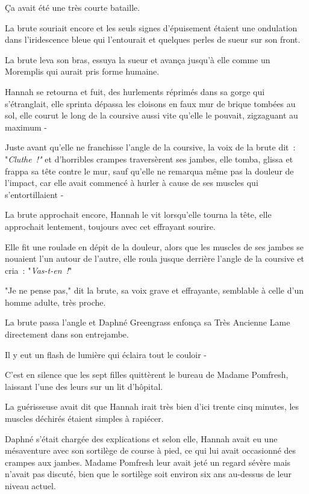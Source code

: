 Ça avait été une très courte bataille.

La brute souriait encore et les seuls signes d'épuisement étaient une ondulation dans l'iridescence bleue qui l'entourait et quelques perles de sueur sur son front.

La brute leva son bras, essuya la sueur et avança jusqu'à elle comme un Moremplis qui aurait pris forme humaine.

Hannah se retourna et fuit, des hurlements réprimés dans sa gorge qui s'étranglait, elle sprinta dépassa les cloisons en faux mur de brique tombées au sol, elle courut le long de la coursive aussi vite qu'elle le pouvait, zigzaguant au maximum -

Juste avant qu'elle ne franchisse l'angle de la coursive, la voix de la brute dit~: "\emph{Cluthe~!"} et d'horribles crampes traversèrent ses jambes, elle tomba, glissa et frappa sa tête contre le mur, sauf qu'elle ne remarqua même pas la douleur de l'impact, car elle avait commencé à hurler à cause de ses muscles qui s'entortillaient -

La brute approchait encore, Hannah le vit lorsqu'elle tourna la tête, elle approchait lentement, toujours avec cet effrayant sourire.

Elle fit une roulade en dépit de la douleur, alors que les muscles de ses jambes se nouaient l'un autour de l'autre, elle roula jusque derrière l'angle de la coursive et cria~: "\emph{Vas-t-en~!}"

"Je ne pense pas," dit la brute, sa voix grave et effrayante, semblable à celle d'un homme adulte, très proche.

La brute passa l'angle et Daphné Greengrass enfonça sa Très Ancienne Lame directement dans son entrejambe.

Il y eut un flash de lumière qui éclaira tout le couloir -

\later

C'est en silence que les sept filles quittèrent le bureau de Madame Pomfresh, laissant l'une des leurs sur un lit d'hôpital.

La guérisseuse avait dit que Hannah irait très bien d'ici trente cinq minutes, les muscles déchirés étaient simples à rapiécer.

Daphné s'était chargée des explications et selon elle, Hannah avait eu une mésaventure avec son sortilège de course à pied, ce qui lui avait occasionné des crampes aux jambes. Madame Pomfresh leur avait jeté un regard sévère mais n'avait pas discuté, bien que le sortilège soit environ six ans au-dessus de leur niveau actuel.

